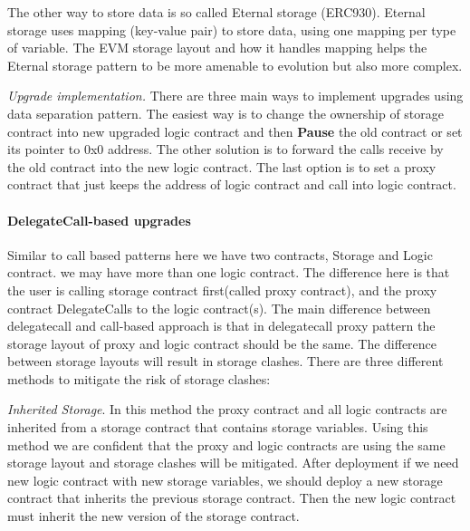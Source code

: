 The other way to store data is so called Eternal storage (ERC930). Eternal storage uses mapping (key-value pair) to store data, using one mapping per type of variable. The EVM storage layout and how it handles mapping helps the Eternal storage pattern to be more amenable to evolution but also more complex.

\textit{Upgrade implementation. } There are three main ways to implement upgrades using data separation pattern. The easiest way is to change the ownership of storage contract into new upgraded logic contract and then \textbf{Pause} the old contract or set its pointer to 0x0 address. The other solution is to forward the calls receive by the old contract into the new logic contract. The last option is to set a proxy contract that just keeps the address of logic contract and call into logic contract.




\paragraph{DelegateCall-based upgrades}
Similar to call based patterns here we have two contracts, Storage and Logic contract. we may have more than one logic contract. The difference here is that the user is calling storage contract first(called proxy contract), and the proxy contract DelegateCalls to the logic contract(s).
The main difference between delegatecall and call-based approach is that in delegatecall proxy pattern the storage layout of proxy and logic contract should be the same. The difference between storage layouts will result in storage clashes. 
There are three different methods to mitigate the risk of storage clashes:

\textit{Inherited Storage}. 
In this method the proxy contract and all logic contracts are inherited from a storage contract that contains storage variables. Using this method we are confident that the proxy and logic contracts are using the same storage layout and storage clashes will be mitigated.
After deployment if we need new logic contract with new storage variables, we should deploy a new storage contract that inherits the previous storage contract. Then the new logic contract must inherit the new version of the storage contract.

